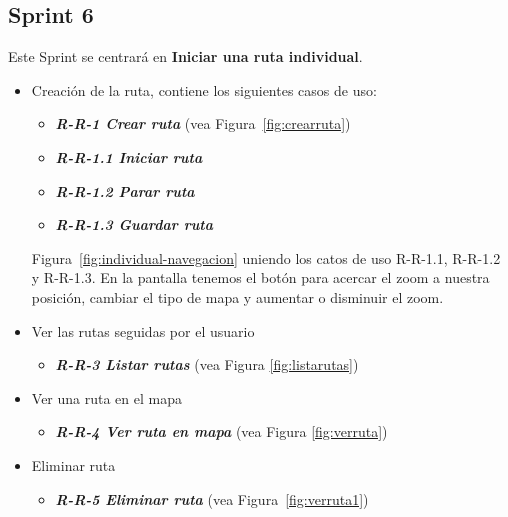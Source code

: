 \subsection{Sprint 6}
Este Sprint se centrará en \textbf{Iniciar una ruta individual}.

\begin{itemize}
\item Creación de la ruta, contiene los siguientes casos de uso:

\begin{itemize}
\item \textbf{\textit{R-R-1 Crear ruta}} (vea Figura~\ref{fig:crearruta})
\item \textbf{\textit{R-R-1.1 Iniciar ruta}}
\item\textbf{ \textit{R-R-1.2 Parar ruta}}
\item \textbf{\textit{R-R-1.3 Guardar ruta}} 
\end{itemize}
Figura~\ref{fig:individual-navegacion} uniendo los catos de uso R-R-1.1, R-R-1.2 y R-R-1.3. En la pantalla tenemos el botón para acercar el zoom a nuestra posición, cambiar el tipo de mapa y aumentar o disminuir el zoom.
\item Ver las rutas seguidas por el usuario

\begin{itemize}
\item \textbf{\textit{R-R-3 Listar rutas} } (vea Figura \ref{fig:listarutas})

\end{itemize}
\item Ver una ruta en el mapa 

\begin{itemize}
\item \textbf{\textit{R-R-4 Ver ruta en mapa}}  (vea Figura \ref{fig:verruta})

\end{itemize}
\item Eliminar ruta

\begin{itemize}
\item \textbf{\textit{R-R-5 Eliminar ruta}} (vea Figura~\ref{fig:verruta1})

\end{itemize}

\end{itemize}








